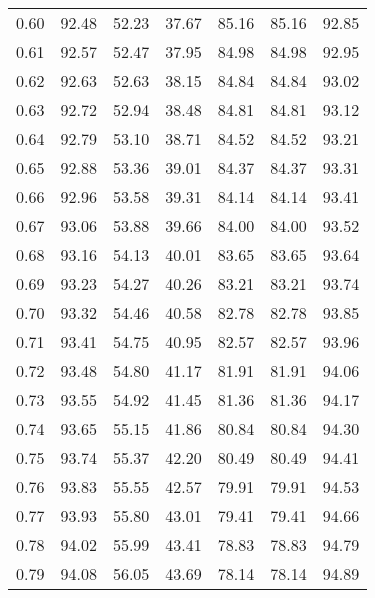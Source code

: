 \begin{tabular}{|c|c|c|c|c|c|c|}
      0.60 &     92.48 &     52.23 &      37.67 &   85.16 &      85.16 &         92.85 \\
      0.61 &     92.57 &     52.47 &      37.95 &   84.98 &      84.98 &         92.95 \\
      0.62 &     92.63 &     52.63 &      38.15 &   84.84 &      84.84 &         93.02 \\
      0.63 &     92.72 &     52.94 &      38.48 &   84.81 &      84.81 &         93.12 \\
      0.64 &     92.79 &     53.10 &      38.71 &   84.52 &      84.52 &         93.21 \\
      0.65 &     92.88 &     53.36 &      39.01 &   84.37 &      84.37 &         93.31 \\
      0.66 &     92.96 &     53.58 &      39.31 &   84.14 &      84.14 &         93.41 \\
      0.67 &     93.06 &     53.88 &      39.66 &   84.00 &      84.00 &         93.52 \\
      0.68 &     93.16 &     54.13 &      40.01 &   83.65 &      83.65 &         93.64 \\
      0.69 &     93.23 &     54.27 &      40.26 &   83.21 &      83.21 &         93.74 \\
      0.70 &     93.32 &     54.46 &      40.58 &   82.78 &      82.78 &         93.85 \\
      0.71 &     93.41 &     54.75 &      40.95 &   82.57 &      82.57 &         93.96 \\
      0.72 &     93.48 &     54.80 &      41.17 &   81.91 &      81.91 &         94.06 \\
      0.73 &     93.55 &     54.92 &      41.45 &   81.36 &      81.36 &         94.17 \\
      0.74 &     93.65 &     55.15 &      41.86 &   80.84 &      80.84 &         94.30 \\
      0.75 &     93.74 &     55.37 &      42.20 &   80.49 &      80.49 &         94.41 \\
      0.76 &     93.83 &     55.55 &      42.57 &   79.91 &      79.91 &         94.53 \\
      0.77 &     93.93 &     55.80 &      43.01 &   79.41 &      79.41 &         94.66 \\
      0.78 &     94.02 &     55.99 &      43.41 &   78.83 &      78.83 &         94.79 \\
      0.79 &     94.08 &     56.05 &      43.69 &   78.14 &      78.14 &         94.89 \\

\end{tabular}
